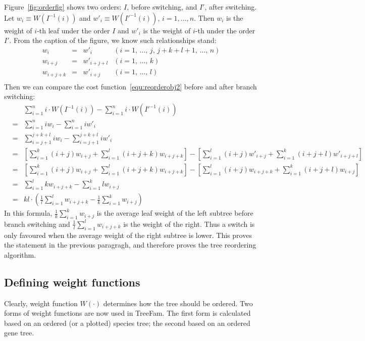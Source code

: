 Figure~\ref{fig:orderfig} shows two orders: $I$, before switching, and $I'$,
after switching. Let $w_i\equiv W(I^{-1}(i))$ and $w'_i\equiv W(I'^{-1}(i))$, $i=1,\ldots,n$.
Then $w_i$ is the weight of $i$-th leaf under the order $I$ and $w'_i$ is the
weight of $i$-th under the order $I'$. From the caption of the figure, we know
such relationships stand:
\[\begin{array}{rcll}
w_i &=& w'_i & (i=1,\,\ldots,\,j,\,j\!+\!k\!+\!l\!+\!1,\,\ldots,\,n) \\
w_{i+j} &=& w'_{i+j+l} & (i=1,\,\ldots,\,k) \\
w_{i+j+k} &=& w'_{i+j} & (i=1,\,\ldots,\,l) \\
\end{array}\]
Then we can compare the cost function~\ref{equ:reorderobj2} before and after
branch switching:
\begin{eqnarray*}
&& \sum_{i=1}^n {i\cdot W(I^{-1}(i))} - \sum_{i=1}^n {i\cdot W(I'^{-1}(i))}\\
&=&  \sum_{i=1}^n{i w_i}-\sum_{i=1}^n{i w'_i} \\
&=&  \sum_{i=j+1}^{j+k+l}{i w_i}-\sum_{i=j+1}^{j+k+l}{i w'_i} \\
&=& \left[\sum_{i=1}^k {(i\!+\!j) w_{i+j}} + \sum_{i=1}^l {(i\!+\!j\!+\!k) w_{i+j+k}}\right]
	- \left[\sum_{i=1}^l {(i\!+\!j) w'_{i+j}}\! +\! \sum_{i=1}^k {(i\!+\!j\!+\!l) w'_{i+j+l}}\right] \\
&=& \left[\sum_{i=1}^k {(i\!+\!j) w_{i+j}} + \sum_{i=1}^l {(i\!+\!j\!+\!k) w_{i+j+k}}\right]
	- \left[\sum_{i=1}^l {(i\!+\!j) w_{i+j+k}} + \sum_{i=1}^k {(i\!+\!j\!+\!l) w_{i+j}}\right] \\
&=& \sum_{i=1}^l {k w_{i+j+k}} - \sum_{i=1}^k {l w_{i+j}} \\
&=& kl\cdot\left(\frac{1}{l}\sum_{i=1}^l w_{i+j+k} - \frac{1}{k}\sum_{i=1}^k w_{i+j}\right)
\end{eqnarray*}
In this formula, $\frac{1}{k}\sum_{i=1}^k w_{i+j}$ is the average leaf weight of the left subtree before branch switching
and $\frac{1}{l}\sum_{i=1}^l w_{i+j+k}$ is the weight of the right. Thus
a switch is only favoured when the average weight of the right subtree is lower.
This proves the statement in the previous paragragh, and therefore proves the tree reordering algorithm.

\subsection{Defining weight functions}
Clearly, weight function $W(\cdot)$ determines how the tree should be ordered.
Two forms of weight functions are now used in TreeFam. The first form is calculated
based on an ordered (or a plotted) species tree; the second based on an ordered gene tree.

